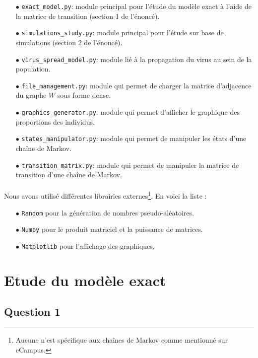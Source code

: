 \documentclass[a4paper, 12pt, oneside]{article}
\begin{document}
\begin{itemize}
	\item[$\bullet$] \texttt{exact\_model.py}: module principal pour l'étude du modèle exact à l'aide de la matrice de transition (section 1 de l'énoncé).
	\item[$\bullet$] \texttt{simulations\_study.py}: module principal pour l'étude sur base de simulations (section 2 de l'énoncé).
	\item[$\bullet$] \texttt{virus\_spread\_model.py}: module lié à la propagation du virus au sein de la population.
	\item[$\bullet$] \texttt{file\_management.py}: module qui permet de charger la matrice d'adjacence du graphe $W$ sous forme dense.
	\item[$\bullet$] \texttt{graphics\_generator.py}: module qui permet d'afficher le graphique des proportions des individus.
	\item[$\bullet$] \texttt{states\_manipulator.py}: module qui permet de manipuler les états d'une chaîne de Markov.
	\item[$\bullet$] \texttt{transition\_matrix.py}: module qui permet de manipuler la matrice de transition d'une chaîne de Markov.
\end{itemize}

\paragraph{}Nous avons utilisé différentes librairies externes\footnote{Aucune n'est spécifique aux chaînes de Markov comme mentionné sur eCampus.}. En voici la liste :

\begin{itemize}
	\item[$\bullet$] \texttt{Random} pour la génération de nombres pseudo-aléatoires.
	\item[$\bullet$] \texttt{Numpy} pour le produit matriciel et la puissance de matrices.
	\item[$\bullet$] \texttt{Matplotlib} pour l'affichage des graphiques.
\end{itemize}

\section{Etude du modèle exact}

\subsection{Question 1}
	
\end{document}
